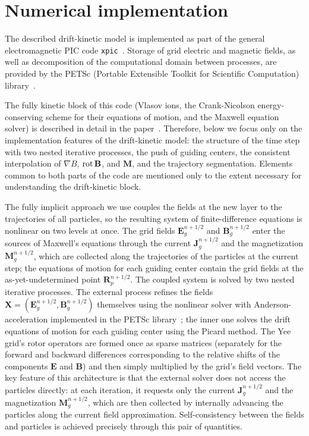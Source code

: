 \documentclass[final,3p]{elsarticle}
\newcommand{\rot}{\mbox{\rm{rot\,}}}
\begin{document}
\section{Numerical implementation}\label{s3}
 
The described drift-kinetic model is implemented as part of the general electromagnetic PIC code \texttt{xpic}~\cite{xpic}. Storage of grid electric and magnetic fields, as well as decomposition of the computational domain between processes, are provided by the PETSc (Portable Extensible Toolkit for Scientific Computation) library~\cite{petsc}.

The fully kinetic block of this code (Vlasov ions, the Crank-Nicolson energy-conserving scheme for their equations of motion, and the Maxwell equation solver) is described in detail in the paper~\cite{Kurshakov2026}.
Therefore, below we focus only on the implementation features of the drift-kinetic model: the structure of the time step with two nested iterative processes, the push of guiding centers, the consistent interpolation of $\nabla B$, $\rot\mathbf{B}$, and $\mathbf{M}$, and the trajectory segmentation. Elements common to both parts of the code are mentioned only to the extent necessary for understanding the drift-kinetic block.

The fully implicit approach we use couples the fields at the new layer to the trajectories of all particles, so the resulting system of finite-difference equations is nonlinear on two levels at once. The grid fields $\mathbf{E}_g^{n+1/2}$ and $\mathbf{B}_g^{n+1/2}$ enter the sources of Maxwell's equations through the current $\mathbf{J}_g^{n+1/2}$ and the magnetization $\mathbf{M}_g^{n+1/2}$, which are collected along the trajectories of the particles at the current step; the equations of motion for each guiding center contain the grid fields at the as-yet-undetermined point $\mathbf{R}_p^{n+1/2}$. The coupled system is solved by two nested iterative processes. The external process refines the fields $\mathbf{X}=(\mathbf{E}_g^{n+1/2},\mathbf{B}_g^{n+1/2})$ themselves using the nonlinear solver with Anderson-acceleration implemented in the PETSc library~\cite{Anderson1965}; the inner one solves the drift equations of motion for each guiding center using the Picard method. The Yee grid's rotor operators are formed once as sparse matrices (separately for the forward and backward differences corresponding to the relative shifts of the components $\mathbf{E}$ and $\mathbf{B}$) and then simply multiplied by the grid's field vectors. The key feature of this architecture is that the external solver does not access the particles directly: at each iteration, it requests only the current $\mathbf{J}_g^{n+1/2}$ and the magnetization $\mathbf{M}_g^{n+1/2}$, which are then collected by internally advancing the particles along the current field approximation. Self-consistency between the fields and particles is achieved precisely through this pair of quantities.
\end{document}
